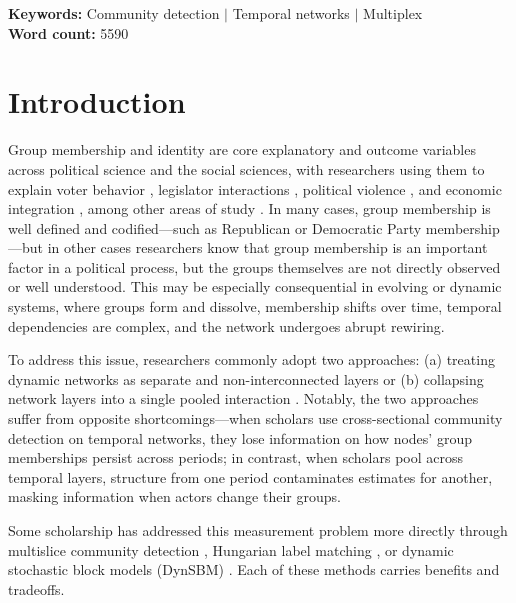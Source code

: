 \documentclass[11pt, letterpaper]{article}
\begin{document}
\begin{titlingpage}
\begin{center}
\textbf{Keywords:} Community detection $|$ Temporal networks $|$ Multiplex \\
\textbf{Word count:} 5590
\end{center}
\end{titlingpage}

\newpage
\clearpage
\doublespacing
\newcommand{\best}[1]{\cellcolor{green!15}#1}
\section{Introduction}
Group membership and identity are core explanatory and outcome variables across political science and the social sciences, with researchers using them to explain voter behavior \citep{conevska2026partisan, huddy2015expressive, santoro2023political}, legislator interactions \citep{box_steffensmeier_2019_dear_colleague, Kim_Kunisky_2021}, political violence \citep{cederman2010why, dorff2020Nigeria}, and economic integration \citep{lupu2013trading}, among other areas of study \citep{hafnerburton2009network, renshon2016status}. In many cases, group membership is well defined and codified---such as Republican or Democratic Party membership---but in other cases researchers know that group membership is an important factor in a political process, but the groups themselves are not directly observed or well understood. This may be especially consequential in evolving or dynamic systems, where groups form and dissolve, membership shifts over time, temporal dependencies are complex, and the network undergoes abrupt rewiring.

To address this issue, researchers commonly adopt two approaches: (a) treating dynamic networks as separate and non-interconnected layers \citep{choi2026Jpr, edgerton2026human,lupu2017networked, renshon2016status} or (b) collapsing network layers into a single pooled interaction \citep{bearman2004chains, moody2004structure}. Notably, the two approaches suffer from opposite shortcomings---when scholars use cross-sectional community detection on temporal networks, they lose information on how nodes' group memberships
persist across periods; in contrast, when scholars pool across temporal layers, structure from one period contaminates estimates for another, masking information when actors change their groups.

Some scholarship has addressed this measurement problem more directly through multislice community detection \citep{beardsley2020hierarchy, cranmer2015kantian, mucha2010community}, Hungarian label matching \citep{greene2010tracking, kuhn1955hungarian}, or dynamic stochastic block models (DynSBM) \citep{matias2017statistical,  olivella2022dynamic}. Each of these methods carries benefits and tradeoffs. 
\end{document}
